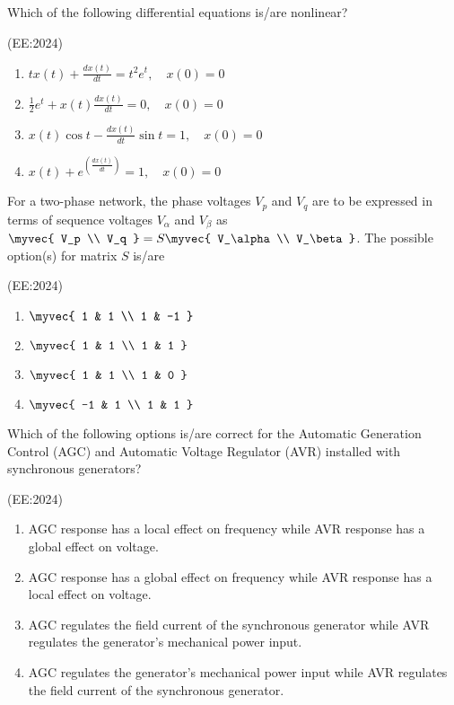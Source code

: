     \item Which of the following differential equations is/are nonlinear? 

	    \hfill{(EE:2024)}
		\begin{multicols}{2}
    \begin{enumerate}
        \item $t x(t) + \frac{dx(t)}{dt} = t^2 e^t, \quad x(0) = 0$
        \item $\frac{1}{2} e^t + x(t) \frac{dx(t)}{dt} = 0, \quad x(0) = 0$
        \item $x(t) \cos t - \frac{dx(t)}{dt} \sin t = 1, \quad x(0) = 0$
        \item $x(t) + e^{\left(\frac{dx(t)}{dt}\right)} = 1, \quad x(0) = 0$
    \end{enumerate}
			\end{multicols}

    \item For a two-phase network, the phase voltages $V_p$ and $V_q$ are to be expressed in terms of sequence voltages $V_\alpha$ and $V_\beta$ as $\myvec{ V_p \\ V_q } = S \myvec{ V_\alpha \\ V_\beta }$. The possible option(s) for matrix $S$ is/are 

		    \hfill{(EE:2024)}
		    \begin{multicols}{4}
    \begin{enumerate}
        \item $\myvec{ 1 & 1 \\ 1 & -1 }$
        \item $\myvec{ 1 & 1 \\ 1 & 1 }$
        \item $\myvec{ 1 & 1 \\ 1 & 0 }$
        \item $\myvec{ -1 & 1 \\ 1 & 1 }$
    \end{enumerate}
			    \end{multicols}

    \item Which of the following options is/are correct for the Automatic Generation Control (AGC) and Automatic Voltage Regulator (AVR) installed with synchronous generators?

	    \hfill{(EE:2024)}
    \begin{enumerate}
        \item AGC response has a local effect on frequency while AVR response has a global effect on voltage.
        \item AGC response has a global effect on frequency while AVR response has a local effect on voltage.
        \item AGC regulates the field current of the synchronous generator while AVR regulates the generator's mechanical power input.
        \item AGC regulates the generator's mechanical power input while AVR regulates the field current of the synchronous generator.
    \end{enumerate}

